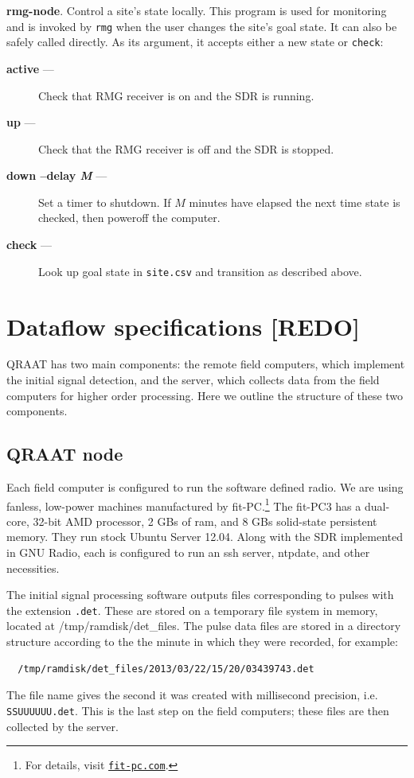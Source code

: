 \documentclass[letter]{article}
\newcounter{foot}
\begin{document}
\textbf{rmg-node}. Control a site's state locally. This program is used for monitoring 
and is invoked by \texttt{rmg} when the user changes the site's goal state. It can also be safely
called directly. As its argument, it accepts either a new state or \texttt{check}: 
\begin{description}
  \item[\quad \textbf{active} ---] Check that RMG receiver is on and the SDR is running. 
  \item[\quad \textbf{up} ---] Check that the RMG receiver is off and the SDR is stopped. 
  \item[\quad \textbf{down --delay \textit{M}} ---] Set a timer to shutdown. If $M$ minutes have 
    elapsed the next time state is checked, then poweroff the computer. 
  \item[\quad \textbf{check} ---] Look up goal state in \texttt{site.csv} and transition
    as described above. 
\end{description}



\section{Dataflow specifications [REDO]}
QRAAT has two main components: the remote field computers, which implement the initial 
signal detection, and the server, which collects data from the field computers for 
higher order processing. Here we outline the structure of these two components. 

\subsection{QRAAT node}
Each field computer is configured to run the software defined radio. We are using 
fanless, low-power machines manufactured by fit-PC.\footnote{For details, visit
\href{http://www.fit-pc.com}{\tt fit-pc.com}.} The fit-PC3 has a dual-core, 32-bit AMD
processor, 2 GBs of ram, and 8 GBs solid-state persistent memory. They 
run stock Ubuntu Server 12.04. Along with the SDR implemented in GNU Radio, each is 
configured to run an ssh server, ntpdate, and other necessities. 

The initial signal processing software outputs files corresponding to pulses 
with the extension \texttt{.det}. These are stored on a temporary file system in memory, 
located at /tmp/ramdisk/det\_files. The pulse data files are stored in a directory 
structure according to the the minute in which they were recorded, for example: 
\begin{verbatim}
  /tmp/ramdisk/det_files/2013/03/22/15/20/03439743.det
\end{verbatim}
The file name gives the second it was created with millisecond precision, i.e. 
\texttt{SSUUUUUU.det}. This is the last step on the field computers; these files are 
then collected by the server. 
\end{document}
